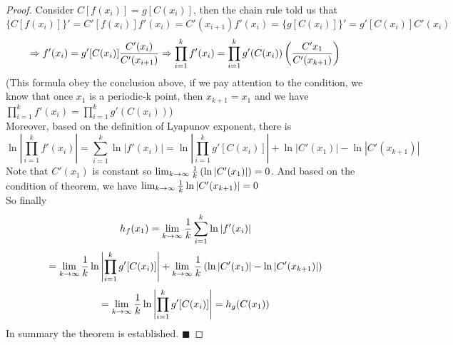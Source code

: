 \documentclass[12pt]{article}
\theoremstyle{plain}
\newtheorem{proof}{\textit{PROOF}}[section]
\begin{document}
{\color{blue}
\begin{proof} Consider $C[f(x_i)] = g[C(x_i)]$, then the chain rule told us that
$$
\{C[f(x_i)]\}' = C'[f(x_i)]f'(x_i) = C'(x_{i+1})f'(x_i) = \{g[C(x_i)]\}' = g'[C(x_i)]C'(x_i) 
$$
$$\Rightarrow  f'(x_i) = g'[C(x_i)]{C'(x_i) \over C'(x_{i+1})} \Rightarrow \prod_{i = 1}^{k}f'(x_i) = \prod_{i = 1}^{k}g'(C(x_i))\left(C'{x_1} \over C'(x_{k+1})\right)
$$
(This formula obey the conclusion above, if we pay attention to the condition, we know that once $x_1$ is a periodic-k point, then $x_{k+1} = x_1$ and we have $\prod_{i = 1}^{k}f'(x_i) = \prod_{i = 1}^{k}g'(C(x_i))$) 
\\\noindent Moreover, based on the definition of Lyapunov exponent, there is
$$
\ln\left|\prod_{i = 1}^{k}f'(x_i) \right| = \sum_{i = 1}^{k}\ln\left|f'(x_i) \right| 
= \ln\left|\prod_{i = 1}^{k}g'[C(x_i)] \right| + \ln\left|C'(x_1) \right| - \ln\left|C'(x_{k+1}) \right| 
$$
Note that $C'(x_1)$ is constant so $ \lim_{k \rightarrow \infty} {1 \over k}\left(\ln\left|C'(x_1) \right| \right) = 0$. And based on the condition of theorem, we have $\lim_{k \rightarrow \infty}{1 \over k}\ln\left|C'(x_{k+1}) \right| = 0$
\\\noindent So finally 
$$
h_f(x_1) = \lim_{k \rightarrow \infty}{1\over k}\sum_{i = 1}^{k}\ln\left|f'(x_i) \right| 
$$
$$
= \lim_{k \rightarrow \infty}{1\over k}\ln\left|\prod_{i = 1}^{k}g'[C(x_i)] \right| + \lim_{k \rightarrow \infty} {1 \over k}\left(\ln\left|C'(x_1) \right| - \ln\left|C'(x_{k+1}) \right| \right) 
$$
$$
= \lim_{k \rightarrow \infty}{1\over k}\ln\left|\prod_{i = 1}^{k}g'[C(x_i)] \right| = h_g(C(x_1))
$$
In summary the theorem is established. $\blacksquare$

\end{proof}
}
\end{document}
